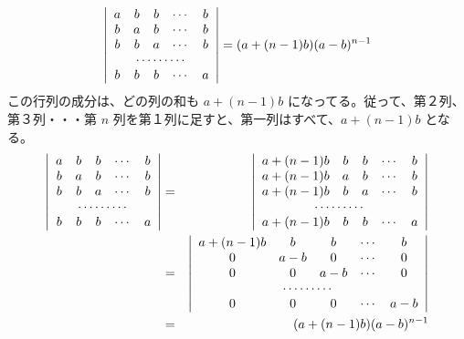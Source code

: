 \begin{eg}
$$\left|\begin{array}{ccccc}a & b & b & \cdots & b \\
b & a & b & \cdots & b \\b & b & a & \cdots & b \\\multicolumn{5}{c}{\cdots\cdots\cdots} \\b & b & b & \cdots & a
\end{array}\right| = (a+(n-1)b)(a-b)^{n-1}$$
この行列の成分は、どの列の和も $a+(n-1)b$ になってる。従って、第２列、第３列・・・第 $n$ 列を第１列に足すと、第一列はすべて、$a+(n-1)b$ となる。
\begin{eqnarray*}
\left|\begin{array}{ccccc}a & b & b & \cdots & b \\
b & a & b & \cdots & b \\b & b & a & \cdots & b \\\multicolumn{5}{c}{\cdots\cdots\cdots} \\b & b & b & \cdots & a
\end{array}\right| & = & 
\left|\begin{array}{ccccc}a+(n-1)b & b & b & \cdots & b \\
a+(n-1)b & a & b & \cdots & b \\a+(n-1)b & b & a & \cdots & b \\\multicolumn{5}{c}{\cdots\cdots\cdots} \\a+(n-1)b & b & b & \cdots & a
\end{array}\right| \\
& = & 
\left|\begin{array}{ccccc}a+(n-1)b & b & b & \cdots & b \\
0 & a-b & 0 & \cdots & 0 \\0 & 0 & a-b & \cdots & 0 \\\multicolumn{5}{c}{\cdots\cdots\cdots} \\0 & 0 & 0 & \cdots & a-b
\end{array}\right|\\
& =  &(a+(n-1)b)(a-b)^{n-1}
\end{eqnarray*}
\end{eg}

\newpage
{}

